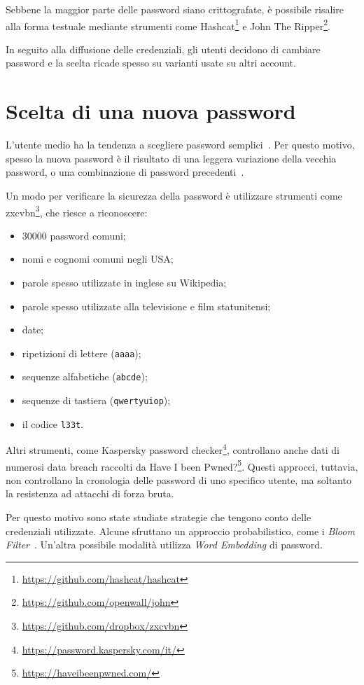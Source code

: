 Sebbene la maggior parte delle password siano crittografate, è possibile risalire alla forma testuale mediante strumenti come Hashcat\footnote{\url{https://github.com/hashcat/hashcat}} e John The Ripper\footnote{\url{https://github.com/openwall/john}}.

In seguito alla diffusione delle credenziali, gli utenti decidono di cambiare password e la scelta ricade spesso su varianti usate su altri account.
\section{Scelta di una nuova password}
\label{sec:scelta di una nuova password}
L'utente medio ha la tendenza a scegliere password semplici~\cite{obspasshab}. Per questo motivo, spesso la nuova password è il risultato di una leggera variazione della vecchia password, o una combinazione di password precedenti~\cite{hypr}.

Un modo per verificare la sicurezza della password è utilizzare strumenti come zxcvbn\footnote{\url{https://github.com/dropbox/zxcvbn}}, che riesce a riconoscere:
\begin{itemize}
    \item 30000 password comuni;
    \item nomi e cognomi comuni negli USA;
    \item parole spesso utilizzate in inglese su Wikipedia;
    \item parole spesso utilizzate alla televisione e film statunitensi;
    \item date;
    \item ripetizioni di lettere (\texttt{aaaa});
    \item sequenze alfabetiche (\texttt{abcde});
    \item sequenze di tastiera (\texttt{qwertyuiop});
    \item il codice \texttt{l33t}.
\end{itemize}

Altri strumenti, come Kaspersky password checker\footnote{\url{https://password.kaspersky.com/it/}}, controllano anche dati di numerosi data breach raccolti da Have I been Pwned?\footnote{\url{https://haveibeenpwned.com/}}.
Questi approcci, tuttavia, non controllano la cronologia delle password di uno specifico utente, ma soltanto la resistenza ad attacchi di forza bruta.

Per questo motivo sono state studiate strategie che tengono conto delle credenziali utilizzate.
Alcune sfruttano un approccio probabilistico, come i \emph{Bloom Filter}~\cite{bloom}. Un'altra possibile modalità utilizza \emph{Word Embedding} di password.

